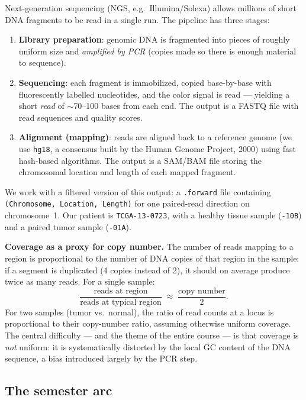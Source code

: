 \documentclass[11pt]{article}
\newcommand{\code}[1]{\texttt{#1}}
\begin{document}
Next-generation sequencing (NGS, e.g.\ Illumina/Solexa) allows millions of short DNA
fragments to be read in a single run. The pipeline has three stages:
\begin{enumerate}[leftmargin=*]
  \item \textbf{Library preparation}: genomic DNA is fragmented into pieces of roughly
    uniform size and \emph{amplified by PCR} (copies made so there is enough material
    to sequence).
  \item \textbf{Sequencing}: each fragment is immobilized, copied base-by-base with
    fluorescently labelled nucleotides, and the color signal is read --- yielding a
    short \emph{read} of $\sim$70--100 bases from each end. The output is a FASTQ file
    with read sequences and quality scores.
  \item \textbf{Alignment (mapping)}: reads are aligned back to a reference genome
    (we use \code{hg18}, a consensus built by the Human Genome Project, 2000) using
    fast hash-based algorithms. The output is a SAM/BAM file storing the
    chromosomal location and length of each mapped fragment.
\end{enumerate}
We work with a filtered version of this output: a \code{.forward} file containing
\code{(Chromosome, Location, Length)} for one paired-read direction on chromosome~1.
Our patient is \code{TCGA-13-0723}, with a healthy tissue sample
(\code{-10B}) and a paired tumor sample (\code{-01A}).

\textbf{Coverage as a proxy for copy number.} The number of reads mapping to a region
is proportional to the number of DNA copies of that region in the sample: if a segment
is duplicated (4 copies instead of 2), it should on average produce twice as many reads.
For a single sample:
\[
  \frac{\text{reads at region}}{\text{reads at typical region}} \;\approx\;
  \frac{\text{copy number}}{2}.
\]
For two samples (tumor vs.\ normal), the ratio of read counts at a locus is proportional
to their copy-number ratio, assuming otherwise uniform coverage. The central difficulty
--- and the theme of the entire course --- is that coverage is \emph{not} uniform:
it is systematically distorted by the local GC content of the DNA sequence, a bias
introduced largely by the PCR step.

\subsection{The semester arc}
\end{document}
